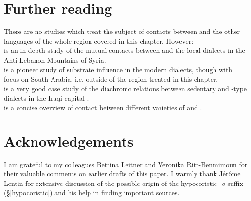 \documentclass[output=paper]{langsci/langscibook}
\begin{document}
\section*{Further reading}

There are no studies which treat the subject of contacts between  and the other languages of the whole region covered in this chapter. However:\\
\citet{ArnoldBehnstedt1993} is an in-depth study of the mutual contacts between  and the local  dialects in the Anti-Lebanon Mountains of Syria.\\
\citet{Diem1979} is a pioneer study of {substrate} influence in the modern  dialects, though with focus on South Arabia, i.e. outside of the region treated in this chapter.\\
\citet{Palva2009} is a very good case study of the diachronic relations between sedentary and -type dialects in the Iraqi capital .\\
\citet{Weninger2011Aramaic} is a concise overview of contact between different varieties of  and .

\section*{Acknowledgements}
I am grateful to my colleagues Bettina Leitner and Veronika Ritt-Benmimoun for their valuable comments on earlier drafts of this paper. I warmly thank Jérôme Lentin for extensive discussion of the possible origin of the hypocoristic \textit{-o} suffix (§\ref{hypocoristic}) and his help in finding important sources.
\end{document}
